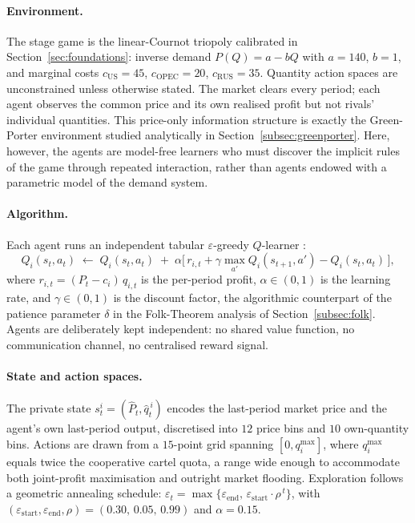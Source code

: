 \paragraph{Environment.}
The stage game is the linear-Cournot triopoly calibrated in
Section~\ref{sec:foundations}: inverse demand $P(Q) = a - bQ$ with $a = 140$, $b = 1$,
and marginal costs $c_{\text{US}} = 45$, $c_{\text{OPEC}} = 20$,
$c_{\text{RUS}} = 35$. Quantity action spaces are unconstrained
unless otherwise stated. The market clears every period; each agent
observes the common price and its own realised profit but not
rivals' individual quantities. This price-only information
structure is exactly the Green-Porter environment studied
analytically in Section~\ref{subsec:greenporter}. Here, however,
the agents are model-free learners who must discover the implicit
rules of the game through repeated interaction, rather than agents
endowed with a parametric model of the demand system.

\paragraph{Algorithm.}
Each agent runs an independent tabular $\varepsilon$-greedy
$Q$-learner \citep{watkins1992}\citep[p.~??]{sutton2018}:
\begin{equation}
  \label{eq:qlearn}
  Q_i(s_t, a_t) \;\leftarrow\; Q_i(s_t, a_t)
    \;+\; \alpha\bigl[\,r_{i,t}
      + \gamma\max_{a'} Q_i(s_{t+1}, a')
      - Q_i(s_t, a_t)\,\bigr],
\end{equation}
where $r_{i,t} = (P_t - c_i)\,q_{i,t}$ is the per-period profit,
$\alpha \in (0,1)$ is the learning rate, and $\gamma \in (0,1)$
is the discount factor, the algorithmic counterpart of the
patience parameter $\delta$ in the Folk-Theorem analysis of
Section~\ref{subsec:folk}. Agents are deliberately kept independent: no shared
value function, no communication channel, no centralised reward
signal.

\paragraph{State and action spaces.}
The private state $s_t^i = (\hat{P}_t, \hat{q}_t^{\,i})$ encodes
the last-period market price and the agent's own last-period
output, discretised into $12$ price bins and $10$ own-quantity
bins. Actions are drawn from a $15$-point grid spanning
$[0, q_i^{\max}]$, where $q_i^{\max}$ equals twice the
cooperative cartel quota, a range wide enough to accommodate both
joint-profit maximisation and outright market flooding. Exploration
follows a geometric annealing schedule:
$\varepsilon_t = \max\!\{\varepsilon_{\text{end}},\,
\varepsilon_{\text{start}}\cdot\rho^{\,t}\}$,
with $(\varepsilon_{\text{start}}, \varepsilon_{\text{end}},
\rho) = (0.30,\, 0.05,\, 0.99)$ and $\alpha = 0.15$.

